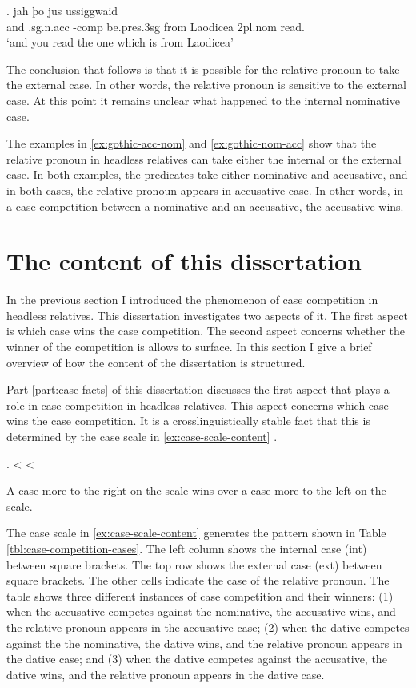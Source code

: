 \exg. jah þo     jus ussiggwaid\\
 and .\ac{sg}.\ac{n}.\ac{acc} -\ac{comp} be.\ac{pres}.3\ac{sg}\scsub{[nom]} from Laodicea 2\ac{pl}.\ac{nom} read.\scsub{[acc]}\\
 `and you read the one which is from Laodicea' \label{ex:gothic-nom-acc}

The conclusion that follows is that it is possible for the relative pronoun to take the external case. In other words, the relative pronoun is sensitive to the external case.
At this point it remains unclear what happened to the internal nominative case.

The examples in \ref{ex:gothic-acc-nom} and \ref{ex:gothic-nom-acc} show that the relative pronoun in headless relatives can take either the internal or the external case. In both examples, the predicates take either nominative and accusative, and in both cases, the relative pronoun appears in accusative case. In other words, in a case competition between a nominative and an accusative, the accusative wins.


\section{The content of this dissertation}

In the previous section I introduced the phenomenon of case competition in headless relatives. This dissertation investigates two aspects of it. The first aspect is which case wins the case competition. The second aspect concerns whether the winner of the competition is allows to surface. In this section I give a brief overview of how the content of the dissertation is structured.

Part \ref{part:case-facts} of this dissertation discusses the first aspect that plays a role in case competition in headless relatives. This aspect concerns which case wins the case competition. It is a crosslinguistically stable fact that this is determined by the case scale in \ref{ex:case-scale-content} \citep[cf.][]{grosu1994}.

\ex.\label{ex:case-scale-content}  <  < 

A case more to the right on the scale wins over a case more to the left on the scale.

The case scale in \ref{ex:case-scale-content} generates the pattern shown in Table \ref{tbl:case-competition-cases}. The left column shows the internal case (\ac{int}) between square brackets. The top row shows the external case (\ac{ext}) between square brackets. The other cells indicate the case of the relative pronoun. The table shows three different instances of case competition and their winners: (1) when the accusative competes against the nominative, the accusative wins, and the relative pronoun appears in the accusative case; (2) when the dative competes against the the nominative, the dative wins, and the relative pronoun appears in the dative case; and (3) when the dative competes against the accusative, the dative wins, and the relative pronoun appears in the dative case.

